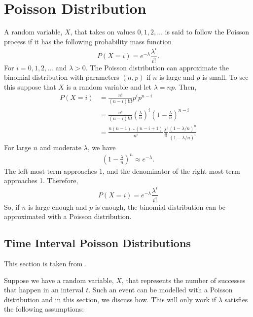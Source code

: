 \documentclass{article}
\begin{document}
\section{Poisson Distribution}

A random variable, $X$, that takes on values $0, 1, 2, \dots$ is said to follow the Poisson process if it has the following probability mass function
\begin{equation}
    P(X = i) = e ^ {-\lambda} \frac{\lambda ^ i}{i!}.
\end{equation}
For $i = 0, 1, 2, \dots$ and $\lambda > 0$. The Poisson distribution can approximate the binomial distribution with parameters $(n, p)$ if $n$ is large and $p$ is small. To see this suppose that $X$ is a random variable and let $\lambda = np$. Then,
\begin{align*}
    P(X = i) & = \frac{n!}{(n - i)!i!} p^i p^{n - i} \\
             & = \frac{n!}{(n - i)!i!} \left( \frac{\lambda}{n} \right)^i \left( 1 - \frac{\lambda}{n} \right)^{n - i} \\
             & = \frac{n(n-1)\dots(n-i+1)}{n^i} \frac{\lambda^i}{i!} \frac{(1 - \lambda / n)^n}{(1 - \lambda / n)^i}
\end{align*}
For large $n$ and moderate $\lambda$, we have
\begin{align*}
    \left(1 - \frac{\lambda}{n}\right)^n \approx e^{-\lambda}.
\end{align*}
The left most term approaches 1, and the denominator of the right most term approaches 1. Therefore,
\begin{equation*}
    P(X = i) = e^{-\lambda} \frac{\lambda^i}{i!}
\end{equation*}
So, if $n$ is large enough and $p$ is enough, the binomial distribution can be approximated with a Poisson distribution.

\subsection{Time Interval Poisson Distributions}

This section is taken from \cite{ross98}.

Suppose we have a random variable, $X$, that represents the number of successes that happen in an interval $t$. Such an event can be modelled with a Poisson distribution and in this section, we discuss how. This will only work if $\lambda$ satisfies the following assumptions:
\end{document}
